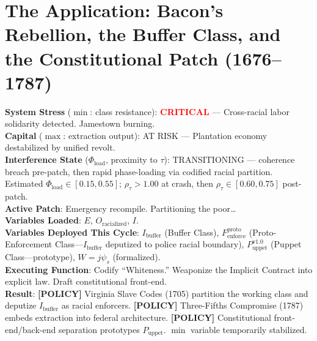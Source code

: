 \chapter{The Application: Bacon's Rebellion, the Buffer Class, and the Constitutional Patch (1676--1787)}
\label{ch:bacon}

\begin{tcolorbox}[colback=black!5, colframe=black!70, fonttitle=\bfseries\ttfamily, title=RUNTIME LOG: 1676--1787 (VIRGINIA COLONY $\rightarrow$ PHILADELPHIA)]
\ttfamily\small
\textbf{System Stress} ($\min$: class resistance): \textcolor{red}{\textbf{CRITICAL}} --- Cross-racial labor solidarity detected. Jamestown burning.\\
\textbf{Capital} ($\max$: extraction output): AT RISK --- Plantation economy destabilized by unified revolt.\\
\textbf{Interference State} ($\Phi_{\text{load}}$, proximity to $\tau$): TRANSITIONING --- coherence breach pre-patch, then rapid phase-loading via codified racial partition. Estimated $\Phi_{\text{load}} \in [0.15, 0.55]$; $\rho_{\tau}>1.00$ at crash, then $\rho_{\tau} \in [0.60, 0.75]$ post-patch.\\
\textbf{Active Patch}: Emergency recompile. Partitioning the poor\ldots\\
\textbf{Variables Loaded}: $E$, $O_{\text{racialized}}$, $I$.\\
\textbf{Variables Deployed This Cycle}: $I_{\text{buffer}}$ (Buffer Class), $F_{\text{enforce}}^{\text{proto}}$ (Proto-Enforcement Class---$I_{\text{buffer}}$ deputized to police racial boundary), $P_{\text{uppet}}^{\text{v1.0}}$ (Puppet Class---prototype), $W = j\psi_s$ (formalized).\\
\textbf{Executing Function}: Codify ``Whiteness.'' Weaponize the Implicit Contract into explicit law. Draft constitutional front-end.\\
\textbf{Result}: \textbf{[POLICY]} Virginia Slave Codes (1705) partition the working class and deputize $I_{\text{buffer}}$ as racial enforcers. \textbf{[POLICY]} Three-Fifths Compromise (1787) embeds extraction into federal architecture. \textbf{[POLICY]} Constitutional front-end/back-end separation prototypes $P_{\text{uppet}}$. $\min$ variable temporarily stabilized.
\end{tcolorbox}

\medskip


